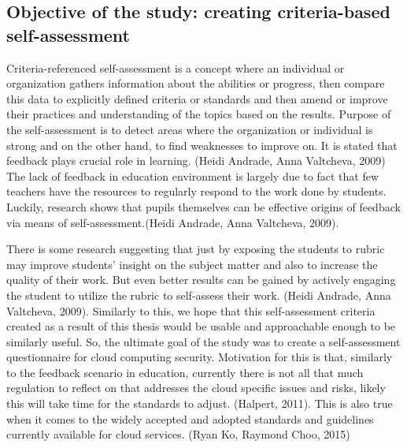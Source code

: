 \documentclass{article}
\begin{document}
\subsection{Objective of the study: creating criteria-based self-assessment}
Criteria-referenced self-assessment is a concept where an individual or organization gathers information about the abilities or progress, then compare this data to explicitly defined criteria or standards and then amend or improve their practices and understanding of the topics based on the results.
Purpose of the self-assessment is to detect areas where the organization or individual is strong and on the other hand, to find weaknesses to improve on. It is stated that feedback plays crucial role in learning. (Heidi Andrade, Anna Valtcheva, 2009)
The lack of feedback in education environment is largely due to fact that few teachers have the resources to regularly respond to the work done by students. Luckily, research shows that pupils themselves can be effective origins of feedback via means of self-assessment.(Heidi Andrade, Anna Valtcheva, 2009).
\par
There is some research suggesting that just by exposing the students to rubric may improve students' insight on the subject matter and also to increase the quality of their work. But even better results can be gained by actively engaging the student to utilize the rubric to self-assess their work. (Heidi Andrade, Anna Valtcheva, 2009). Similarly to this, we hope that this self-assessment criteria created as a result of this thesis would be usable and approachable enough to be similarly useful. 
So, the ultimate goal of the study was to create a self-assessment questionnaire for cloud computing security. Motivation for this is that, similarly to the feedback scenario in education, currently there is not all that much regulation to reflect on that addresses the cloud specific issues and risks, likely this will take time for the standards to adjust. (Halpert, 2011). This is also true when it comes to the widely accepted and adopted standards and guidelines currently available for cloud services. (Ryan Ko, Raymond Choo, 2015)
\end{document}
